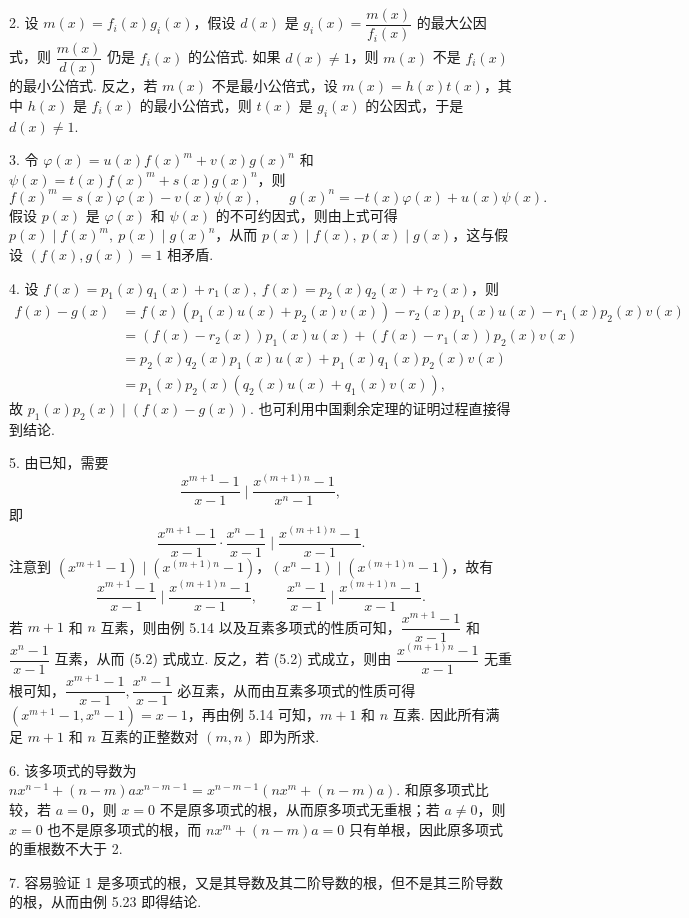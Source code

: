 \documentclass[UTF8,12pt,a4paper,fontset=fandol]{ctexart}
\begin{document}
2. 设 $m(x)=f_i(x)g_i(x)$，假设 $d(x)$ 是 $g_i(x)=\dfrac{m(x)}{f_i(x)}$ 的最大公因式，则 $\dfrac{m(x)}{d(x)}$ 仍是 $f_i(x)$ 的公倍式. 如果 $d(x)\ne1$，则 $m(x)$ 不是 $f_i(x)$ 的最小公倍式. 反之，若 $m(x)$ 不是最小公倍式，设 $m(x)=h(x)t(x)$，其中 $h(x)$ 是 $f_i(x)$ 的最小公倍式，则 $t(x)$ 是 $g_i(x)$ 的公因式，于是 $d(x)\ne1$.

3. 令 $\varphi(x)=u(x)f(x)^m+v(x)g(x)^n$ 和 $\psi(x)=t(x)f(x)^m+s(x)g(x)^n$，则
\[
f(x)^m=s(x)\varphi(x)-v(x)\psi(x),\qquad
g(x)^n=-t(x)\varphi(x)+u(x)\psi(x).
\]
假设 $p(x)$ 是 $\varphi(x)$ 和 $\psi(x)$ 的不可约因式，则由上式可得 $p(x)\mid f(x)^m,\ p(x)\mid g(x)^n$，从而 $p(x)\mid f(x),\ p(x)\mid g(x)$，这与假设 $(f(x),g(x))=1$ 相矛盾.

4. 设 $f(x)=p_1(x)q_1(x)+r_1(x),\ f(x)=p_2(x)q_2(x)+r_2(x)$，则
\[
\begin{aligned}
f(x)-g(x)
&=f(x)(p_1(x)u(x)+p_2(x)v(x))-r_2(x)p_1(x)u(x)-r_1(x)p_2(x)v(x)\\
&=(f(x)-r_2(x))p_1(x)u(x)+(f(x)-r_1(x))p_2(x)v(x)\\
&=p_2(x)q_2(x)p_1(x)u(x)+p_1(x)q_1(x)p_2(x)v(x)\\
&=p_1(x)p_2(x)(q_2(x)u(x)+q_1(x)v(x)),
\end{aligned}
\]
故 $p_1(x)p_2(x)\mid(f(x)-g(x))$. 也可利用中国剩余定理的证明过程直接得到结论.

5. 由已知，需要
\[
\frac{x^{m+1}-1}{x-1}\mid\frac{x^{(m+1)n}-1}{x^n-1},
\]
即
\[
\frac{x^{m+1}-1}{x-1}\cdot\frac{x^n-1}{x-1}\mid\frac{x^{(m+1)n}-1}{x-1}. \tag{5.2}
\]
注意到 $(x^{m+1}-1)\mid(x^{(m+1)n}-1)$，$(x^n-1)\mid(x^{(m+1)n}-1)$，故有
\[
\frac{x^{m+1}-1}{x-1}\mid\frac{x^{(m+1)n}-1}{x-1},\qquad
\frac{x^n-1}{x-1}\mid\frac{x^{(m+1)n}-1}{x-1}.
\]
若 $m+1$ 和 $n$ 互素，则由例 5.14 以及互素多项式的性质可知，$\dfrac{x^{m+1}-1}{x-1}$ 和 $\dfrac{x^n-1}{x-1}$ 互素，从而 (5.2) 式成立. 反之，若 (5.2) 式成立，则由 $\dfrac{x^{(m+1)n}-1}{x-1}$ 无重根可知，$\dfrac{x^{m+1}-1}{x-1},\dfrac{x^n-1}{x-1}$ 必互素，从而由互素多项式的性质可得 $(x^{m+1}-1,x^n-1)=x-1$，再由例 5.14 可知，$m+1$ 和 $n$ 互素. 因此所有满足 $m+1$ 和 $n$ 互素的正整数对 $(m,n)$ 即为所求.

6. 该多项式的导数为 $nx^{n-1}+(n-m)ax^{n-m-1}=x^{n-m-1}(nx^m+(n-m)a)$. 和原多项式比较，若 $a=0$，则 $x=0$ 不是原多项式的根，从而原多项式无重根；若 $a\ne0$，则 $x=0$ 也不是原多项式的根，而 $nx^m+(n-m)a=0$ 只有单根，因此原多项式的重根数不大于 2.

7. 容易验证 1 是多项式的根，又是其导数及其二阶导数的根，但不是其三阶导数的根，从而由例 5.23 即得结论.
\end{document}
